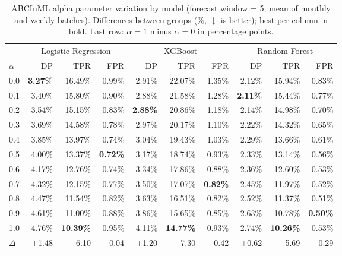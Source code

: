 \begin{table}
  \small
  \caption{ABCInML alpha parameter variation by model (forecast window = 5; mean of monthly and weekly batches). Differences between groups (\%, $\downarrow$ is better); best per column in bold. Last row: $\alpha=1$ minus $\alpha=0$ in percentage points.}
  \label{tab:alpha-models}
  \begin{tabular}{lrrrrrrrrr}
    \toprule
     & \multicolumn{3}{c}{Logistic Regression} & \multicolumn{3}{c}{XGBoost} & \multicolumn{3}{c}{Random Forest} \\
    \cmidrule(lr){2-4} \cmidrule(lr){5-7} \cmidrule(lr){8-10}
    $\alpha$ & DP & TPR & FPR & DP & TPR & FPR & DP & TPR & FPR \\
    \midrule
    0.0 & \textbf{3.27\%} & 16.49\% & 0.99\% & 2.91\% & 22.07\% & 1.35\% & 2.12\% & 15.94\% & 0.83\% \\
    0.1 & 3.40\% & 15.80\% & 0.90\% & 2.88\% & 21.58\% & 1.28\% & \textbf{2.11\%} & 15.44\% & 0.77\% \\
    0.2 & 3.54\% & 15.15\% & 0.83\% & \textbf{2.88\%} & 20.86\% & 1.18\% & 2.14\% & 14.98\% & 0.70\% \\
    0.3 & 3.69\% & 14.58\% & 0.78\% & 2.97\% & 20.17\% & 1.10\% & 2.22\% & 14.32\% & 0.65\% \\
    0.4 & 3.85\% & 13.97\% & 0.74\% & 3.04\% & 19.43\% & 1.03\% & 2.29\% & 13.66\% & 0.61\% \\
    0.5 & 4.00\% & 13.37\% & \textbf{0.72\%} & 3.17\% & 18.74\% & 0.93\% & 2.33\% & 13.14\% & 0.56\% \\
    0.6 & 4.17\% & 12.76\% & 0.74\% & 3.34\% & 17.86\% & 0.88\% & 2.36\% & 12.60\% & 0.53\% \\
    0.7 & 4.32\% & 12.15\% & 0.77\% & 3.50\% & 17.07\% & \textbf{0.82\%} & 2.45\% & 11.97\% & 0.52\% \\
    0.8 & 4.47\% & 11.54\% & 0.82\% & 3.63\% & 16.51\% & 0.82\% & 2.52\% & 11.37\% & 0.51\% \\
    0.9 & 4.61\% & 11.00\% & 0.88\% & 3.86\% & 15.65\% & 0.85\% & 2.63\% & 10.78\% & \textbf{0.50\%} \\
    1.0 & 4.76\% & \textbf{10.39\%} & 0.95\% & 4.11\% & \textbf{14.77\%} & 0.93\% & 2.74\% & \textbf{10.26\%} & 0.53\% \\
    \midrule
    $\Delta$ & +1.48 & -6.10 & -0.04 & +1.20 & -7.30 & -0.42 & +0.62 & -5.69 & -0.29 \\
    \bottomrule
  \end{tabular}
\end{table}
